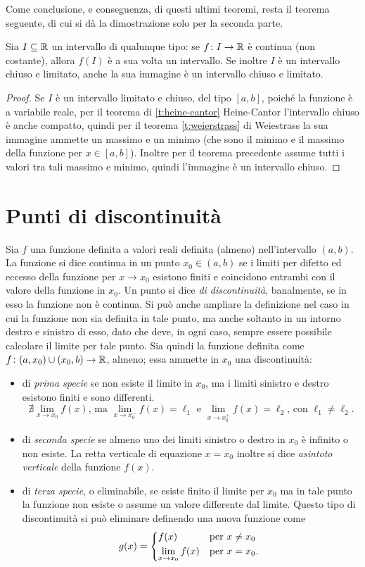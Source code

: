 Come conclusione, e conseguenza, di questi ultimi teoremi, resta il teorema seguente, di cui si dà la dimostrazione solo per la seconda parte.
\begin{teorema}[di Darboux]
\label{t:darboux}
Sia $I\subseteq\mathbb{R}$ un intervallo di qualunque tipo: se $f\colon I\to\mathbb{R}$ è continua (non costante), allora $f(I)$ è a sua volta un intervallo. Se inoltre $I$ è un intervallo chiuso e limitato, anche la sua immagine è un intervallo chiuso e limitato.
\end{teorema}
\begin{proof}
Se $I$ è un intervallo limitato e chiuso, del tipo $[a,b]$, poiché la funzione è a variabile reale, per il teorema di \ref{t:heine-cantor} Heine-Cantor l'intervallo chiuso è anche compatto, quindi per il teorema \ref{t:weierstrass} di Weiestrass la sua immagine ammette un massimo e un minimo (che sono il minimo e il massimo della funzione per $x\in[a,b]$). Inoltre per il teorema precedente assume tutti i valori tra tali massimo e minimo, quindi l'immagine è un intervallo chiuso.
\end{proof}

\section{Punti di discontinuità}
Sia $f$ una funzione definita a valori reali definita (almeno) nell'intervallo $(a,b)$. La funzione si dice continua in un punto $x_0\in (a,b)$ se i limiti per difetto ed eccesso della funzione per $x\to x_0$ esistono finiti e coincidono entrambi con il valore della funzione in $x_0$.
Un punto si dice \emph{di discontinuità}, banalmente, se in esso la funzione non è continua. Si può anche ampliare la definizione nel caso in cui la funzione non sia definita in tale punto, ma anche soltanto in un intorno destro e sinistro di esso, dato che deve, in ogni caso, sempre essere possibile calcolare il limite per tale punto.
Sia quindi la funzione definita come $f\colon(a,x_0)\cup(x_0,b)\to\mathbb{R}$, almeno; essa ammette in $x_0$ una discontinuità:
\begin{itemize}
\item di \emph{prima specie} se non esiste il limite in $x_0$, ma i limiti sinistro e destro esistono finiti e sono differenti.
\[
\nexists\lim_{x\to x_0} f(x)\text{, ma }\lim_{x\to x_0^-} f(x)=\ell_1\text{ e }\lim_{x\to x_0^+} f(x)=\ell_2\text{, con }\ell_1\neq\ell_2.
\]
\item di \emph{seconda specie} se almeno uno dei limiti sinistro o destro in $x_0$ è infinito o non esiste. La retta verticale di equazione $x=x_0$ inoltre si dice \emph{asintoto verticale} della funzione $f(x)$.
\item di \emph{terza specie}, o eliminabile, se esiste finito il limite per $x_0$ ma in tale punto la funzione non esiste o assume un valore differente dal limite. Questo tipo di discontinuità si può eliminare definendo una nuova funzione come
\[
g(x)=
	\begin{dcases*}
	f(x)& per $x\neq x_0$\\
	\lim_{x\to x_0} f(x)& per $x=x_0$.
	\end{dcases*}
\]
\end{itemize}
